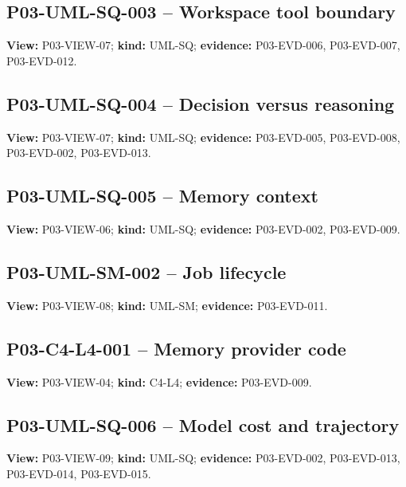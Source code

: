 \documentclass[10pt,letterpaper]{article}
\begin{document}
\subsection{P03-UML-SQ-003 -- Workspace tool boundary}
\textbf{View:} P03-VIEW-07; \textbf{kind:} UML-SQ; \textbf{evidence:} P03-EVD-006, P03-EVD-007, P03-EVD-012.\par
{}
\clearpage

\subsection{P03-UML-SQ-004 -- Decision versus reasoning}
\textbf{View:} P03-VIEW-07; \textbf{kind:} UML-SQ; \textbf{evidence:} P03-EVD-005, P03-EVD-008, P03-EVD-002, P03-EVD-013.\par
{}
\clearpage

\subsection{P03-UML-SQ-005 -- Memory context}
\textbf{View:} P03-VIEW-06; \textbf{kind:} UML-SQ; \textbf{evidence:} P03-EVD-002, P03-EVD-009.\par
{}
\clearpage

\subsection{P03-UML-SM-002 -- Job lifecycle}
\textbf{View:} P03-VIEW-08; \textbf{kind:} UML-SM; \textbf{evidence:} P03-EVD-011.\par
{}
\clearpage

\subsection{P03-C4-L4-001 -- Memory provider code}
\textbf{View:} P03-VIEW-04; \textbf{kind:} C4-L4; \textbf{evidence:} P03-EVD-009.\par
{}
\clearpage

\subsection{P03-UML-SQ-006 -- Model cost and trajectory}
\textbf{View:} P03-VIEW-09; \textbf{kind:} UML-SQ; \textbf{evidence:} P03-EVD-002, P03-EVD-013, P03-EVD-014, P03-EVD-015.\par
{}
\clearpage
\end{document}
